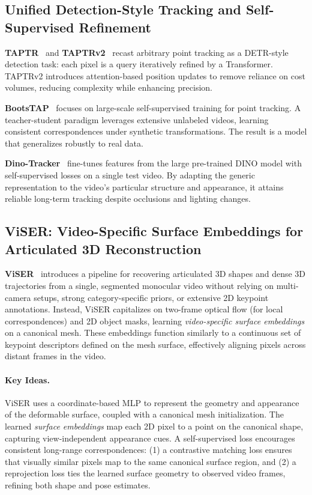 \documentclass[11pt]{article}
\begin{document}
\subsection{Unified Detection-Style Tracking and Self-Supervised Refinement}
\textbf{TAPTR}~\cite{li2024taptr} and \textbf{TAPTRv2}~\cite{li2024taptrv2} recast arbitrary point tracking as a DETR-style detection task: each pixel is a query iteratively refined by a Transformer. TAPTRv2 introduces attention-based position updates to remove reliance on cost volumes, reducing complexity while enhancing precision.

\textbf{BootsTAP}~\cite{doersch2024bootstap} focuses on large-scale self-supervised training for point tracking. A teacher-student paradigm leverages extensive unlabeled videos, learning consistent correspondences under synthetic transformations. The result is a model that generalizes robustly to real data.

\textbf{Dino-Tracker}~\cite{tumanyan2024dino} fine-tunes features from the large pre-trained DINO model with self-supervised losses on a single test video. By adapting the generic representation to the video’s particular structure and appearance, it attains reliable long-term tracking despite occlusions and lighting changes.

\subsection{ViSER: Video-Specific Surface Embeddings for Articulated 3D Reconstruction}
\label{subsec:viser}
\textbf{ViSER}~\cite{yang2021viser} introduces a pipeline for recovering articulated 3D shapes and dense 3D trajectories from a single, segmented monocular video without relying on multi-camera setups, strong category-specific priors, or extensive 2D keypoint annotations. Instead, ViSER capitalizes on two-frame optical flow (for local correspondences) and 2D object masks, learning \emph{video-specific surface embeddings} on a canonical mesh. These embeddings function similarly to a continuous set of keypoint descriptors defined on the mesh surface, effectively aligning pixels across distant frames in the video.

\paragraph{Key Ideas.} 
ViSER uses a coordinate-based MLP to represent the geometry and appearance of the deformable surface, coupled with a canonical mesh initialization. The learned \emph{surface embeddings} map each 2D pixel to a point on the canonical shape, capturing view-independent appearance cues. A self-supervised loss encourages consistent long-range correspondences: (1) a contrastive matching loss ensures that visually similar pixels map to the same canonical surface region, and (2) a reprojection loss ties the learned surface geometry to observed video frames, refining both shape and pose estimates.
\end{document}
